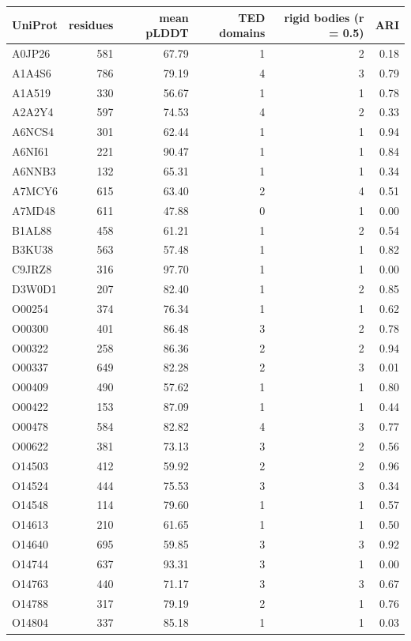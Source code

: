 \begin{longtable}{lrrrrr}
\toprule
UniProt & residues & mean pLDDT & TED domains & rigid bodies (r = 0.5) & ARI \\
\midrule
\endhead
\bottomrule
\endfoot
A0JP26 & 581 & 67.79 & 1 & 2 & 0.18 \\
A1A4S6 & 786 & 79.19 & 4 & 3 & 0.79 \\
A1A519 & 330 & 56.67 & 1 & 1 & 0.78 \\
A2A2Y4 & 597 & 74.53 & 4 & 2 & 0.33 \\
A6NCS4 & 301 & 62.44 & 1 & 1 & 0.94 \\
A6NI61 & 221 & 90.47 & 1 & 1 & 0.84 \\
A6NNB3 & 132 & 65.31 & 1 & 1 & 0.34 \\
A7MCY6 & 615 & 63.40 & 2 & 4 & 0.51 \\
A7MD48 & 611 & 47.88 & 0 & 1 & 0.00 \\
B1AL88 & 458 & 61.21 & 1 & 2 & 0.54 \\
B3KU38 & 563 & 57.48 & 1 & 1 & 0.82 \\
C9JRZ8 & 316 & 97.70 & 1 & 1 & 0.00 \\
D3W0D1 & 207 & 82.40 & 1 & 2 & 0.85 \\
O00254 & 374 & 76.34 & 1 & 1 & 0.62 \\
O00300 & 401 & 86.48 & 3 & 2 & 0.78 \\
O00322 & 258 & 86.36 & 2 & 2 & 0.94 \\
O00337 & 649 & 82.28 & 2 & 3 & 0.01 \\
O00409 & 490 & 57.62 & 1 & 1 & 0.80 \\
O00422 & 153 & 87.09 & 1 & 1 & 0.44 \\
O00478 & 584 & 82.82 & 4 & 3 & 0.77 \\
O00622 & 381 & 73.13 & 3 & 2 & 0.56 \\
O14503 & 412 & 59.92 & 2 & 2 & 0.96 \\
O14524 & 444 & 75.53 & 3 & 3 & 0.34 \\
O14548 & 114 & 79.60 & 1 & 1 & 0.57 \\
O14613 & 210 & 61.65 & 1 & 1 & 0.50 \\
O14640 & 695 & 59.85 & 3 & 3 & 0.92 \\
O14744 & 637 & 93.31 & 3 & 1 & 0.00 \\
O14763 & 440 & 71.17 & 3 & 3 & 0.67 \\
O14788 & 317 & 79.19 & 2 & 1 & 0.76 \\
O14804 & 337 & 85.18 & 1 & 1 & 0.03 \\

\end{longtable}
